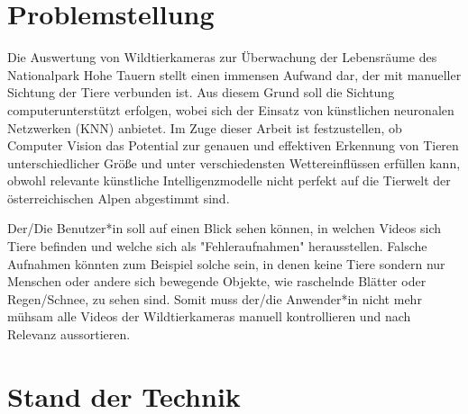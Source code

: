 \section{Problemstellung}
Die Auswertung von Wildtierkameras zur Überwachung der Lebensräume des Nationalpark Hohe Tauern stellt einen immensen Aufwand dar, der mit manueller Sichtung der Tiere verbunden ist. Aus diesem Grund soll die Sichtung computerunterstützt erfolgen, wobei sich der Einsatz von künstlichen neuronalen Netzwerken (KNN) anbietet. Im Zuge dieser Arbeit ist festzustellen, ob Computer Vision das Potential zur genauen und effektiven Erkennung von Tieren unterschiedlicher Größe und unter verschiedensten Wettereinflüssen erfüllen kann, obwohl relevante künstliche Intelligenzmodelle nicht perfekt auf die Tierwelt der österreichischen Alpen abgestimmt sind.\par
Der/Die Benutzer*in soll auf einen Blick sehen können, in welchen Videos sich Tiere befinden und welche sich als "Fehleraufnahmen" herausstellen. Falsche Aufnahmen könnten zum Beispiel solche sein, in denen keine Tiere sondern nur Menschen oder andere sich bewegende Objekte, wie raschelnde Blätter oder Regen/Schnee, zu sehen sind. Somit muss der/die Anwender*in nicht mehr mühsam alle Videos der Wildtierkameras manuell kontrollieren und nach Relevanz aussortieren.

\section{Stand der Technik}

